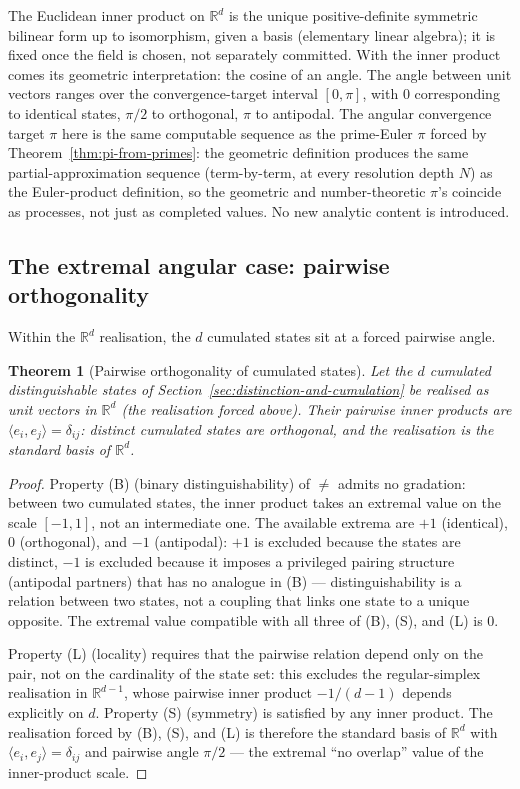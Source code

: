 \documentclass[11pt,a4paper]{article}
\newtheorem{theorem}{Theorem}[section]
\begin{document}
The Euclidean inner product on $\mathbb{R}^d$ is the unique
positive-definite symmetric bilinear form up to isomorphism, given
a basis (elementary linear algebra); it is fixed once the field is
chosen, not separately committed. With the inner product comes its
geometric interpretation: the cosine of an angle. The angle between
unit vectors ranges over the convergence-target interval $[0, \pi]$,
with $0$ corresponding to identical states, $\pi/2$ to orthogonal,
$\pi$ to antipodal. The angular convergence target $\pi$ here is
the same computable sequence as the prime-Euler $\pi$ forced by
Theorem~\ref{thm:pi-from-primes}: the geometric definition produces
the same partial-approximation sequence (term-by-term, at every
resolution depth $N$) as the Euler-product definition, so the
geometric and number-theoretic $\pi$'s coincide as processes, not
just as completed values. No new analytic content is introduced.

\subsection*{The extremal angular case: pairwise orthogonality}

Within the $\mathbb{R}^d$ realisation, the $d$ cumulated states sit
at a forced pairwise angle.

\begin{theorem}[Pairwise orthogonality of cumulated states]\label{thm:orth}
Let the $d$ cumulated distinguishable states of
Section~\ref{sec:distinction-and-cumulation} be realised as
unit vectors in $\mathbb{R}^d$ (the realisation forced above). Their
pairwise inner products are $\langle e_i, e_j\rangle = \delta_{ij}$:
distinct cumulated states are orthogonal, and the realisation is the
standard basis of $\mathbb{R}^d$.
\end{theorem}

\begin{proof}
Property (B) (binary distinguishability) of $\neq$ admits no
gradation: between two cumulated states, the inner product takes an
extremal value on the scale $[-1, 1]$, not an intermediate one. The
available extrema are $+1$ (identical), $0$ (orthogonal), and $-1$
(antipodal): $+1$ is excluded because the states are distinct, $-1$
is excluded because it imposes a privileged pairing structure
(antipodal partners) that has no analogue in (B) ---
distinguishability is a relation between two states, not a coupling
that links one state to a unique opposite. The extremal value
compatible with all three of (B), (S), and (L) is $0$.

Property (L) (locality) requires that the pairwise relation depend
only on the pair, not on the cardinality of the state set: this
excludes the regular-simplex realisation in $\mathbb{R}^{d-1}$, whose
pairwise inner product $-1/(d{-}1)$ depends explicitly on $d$.
Property (S) (symmetry) is satisfied by any inner product. The
realisation forced by (B), (S), and (L) is therefore the standard
basis of $\mathbb{R}^d$ with $\langle e_i, e_j\rangle = \delta_{ij}$
and pairwise angle $\pi/2$ --- the extremal ``no overlap'' value of
the inner-product scale.
\end{proof}
\end{document}
